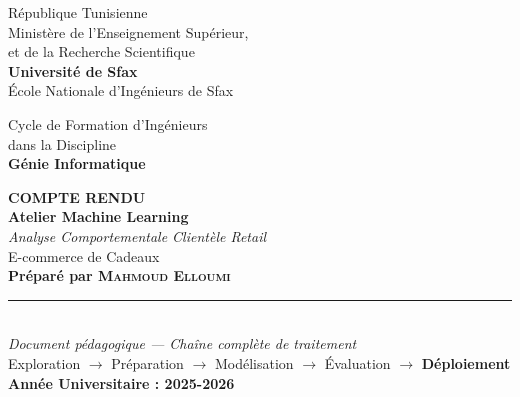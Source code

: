 \documentclass[12pt, a4paper]{article}
\begin{document}
\thispagestyle{empty}
\begin{titlepage}

  \begin{minipage}[c]{0.30\textwidth}
    \centering\small
    République Tunisienne\\
    Ministère de l'Enseignement Supérieur,\\
    et de la Recherche Scientifique\\
    \textbf{Université de Sfax}\\
    École Nationale d'Ingénieurs de Sfax
  \end{minipage}
  \hfill
  \begin{minipage}[c]{0.30\textwidth}
    \centering
    
  \end{minipage}
  \hfill
  \begin{minipage}[c]{0.30\textwidth}
    \centering\small
    Cycle de Formation d'Ingénieurs\\
    dans la Discipline\\
    \textbf{Génie Informatique}
  \end{minipage}

  \vspace{4cm}
  \begin{center}
    {\Huge\bfseries\color{primary} COMPTE RENDU}\\[1.2cm]
    {\Huge\bfseries\color{primary} Atelier Machine Learning}\\[6pt]
    {\large\itshape\color{primary!70} Analyse Comportementale Clientèle Retail}\\[3cm]
    {\LARGE E-commerce de Cadeaux}\\[3cm]
    {\large\bfseries Préparé par \textsc{Mahmoud Elloumi}}\\[1.5cm]

    \rule{8cm}{0.6pt}\\[1cm]
    {\small\itshape Document pédagogique — Chaîne complète de traitement}\\[0.3cm]
    {\small Exploration $\rightarrow$ Préparation $\rightarrow$ Modélisation
            $\rightarrow$ Évaluation $\rightarrow$ \textbf{Déploiement}}\\[1.5cm]
    {\large\bfseries Année Universitaire : 2025-2026}
  \end{center}

\end{titlepage}
\end{document}
